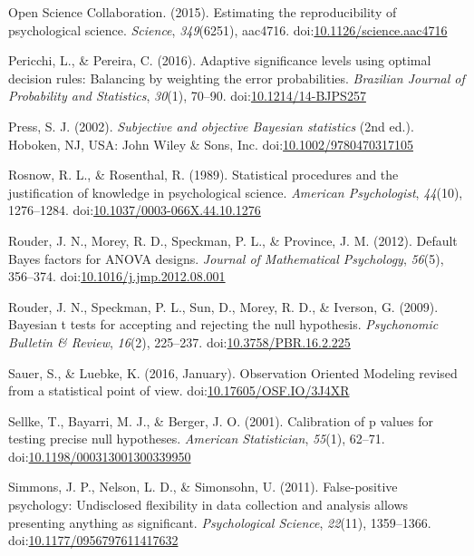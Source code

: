 \documentclass[,man, mask]{apa6}
\theoremstyle{definition}
\theoremstyle{definition}
\theoremstyle{definition}
\theoremstyle{remark}
\begin{document}
\hypertarget{ref-OpenScienceCollaboration2015}{}
Open Science Collaboration. (2015). Estimating the reproducibility of
psychological science. \emph{Science}, \emph{349}(6251), aac4716.
doi:\href{https://doi.org/10.1126/science.aac4716}{10.1126/science.aac4716}

\hypertarget{ref-Pericchi2016}{}
Pericchi, L., \& Pereira, C. (2016). Adaptive significance levels using
optimal decision rules: Balancing by weighting the error probabilities.
\emph{Brazilian Journal of Probability and Statistics}, \emph{30}(1),
70--90.
doi:\href{https://doi.org/10.1214/14-BJPS257}{10.1214/14-BJPS257}

\hypertarget{ref-Press2002}{}
Press, S. J. (2002). \emph{Subjective and objective Bayesian statistics}
(2nd ed.). Hoboken, NJ, USA: John Wiley \& Sons, Inc.
doi:\href{https://doi.org/10.1002/9780470317105}{10.1002/9780470317105}

\hypertarget{ref-Rosnow1989}{}
Rosnow, R. L., \& Rosenthal, R. (1989). Statistical procedures and the
justification of knowledge in psychological science. \emph{American
Psychologist}, \emph{44}(10), 1276--1284.
doi:\href{https://doi.org/10.1037/0003-066X.44.10.1276}{10.1037/0003-066X.44.10.1276}

\hypertarget{ref-Rouder2012}{}
Rouder, J. N., Morey, R. D., Speckman, P. L., \& Province, J. M. (2012).
Default Bayes factors for ANOVA designs. \emph{Journal of Mathematical
Psychology}, \emph{56}(5), 356--374.
doi:\href{https://doi.org/10.1016/j.jmp.2012.08.001}{10.1016/j.jmp.2012.08.001}

\hypertarget{ref-Rouder2009}{}
Rouder, J. N., Speckman, P. L., Sun, D., Morey, R. D., \& Iverson, G.
(2009). Bayesian t tests for accepting and rejecting the null
hypothesis. \emph{Psychonomic Bulletin \& Review}, \emph{16}(2),
225--237.
doi:\href{https://doi.org/10.3758/PBR.16.2.225}{10.3758/PBR.16.2.225}

\hypertarget{ref-Sauer2016}{}
Sauer, S., \& Luebke, K. (2016, January). Observation Oriented Modeling
revised from a statistical point of view.
doi:\href{https://doi.org/10.17605/OSF.IO/3J4XR}{10.17605/OSF.IO/3J4XR}

\hypertarget{ref-Sellke2001}{}
Sellke, T., Bayarri, M. J., \& Berger, J. O. (2001). Calibration of p
values for testing precise null hypotheses. \emph{American
Statistician}, \emph{55}(1), 62--71.
doi:\href{https://doi.org/10.1198/000313001300339950}{10.1198/000313001300339950}

\hypertarget{ref-Simmons2011}{}
Simmons, J. P., Nelson, L. D., \& Simonsohn, U. (2011). False-positive
psychology: Undisclosed flexibility in data collection and analysis
allows presenting anything as significant. \emph{Psychological Science},
\emph{22}(11), 1359--1366.
doi:\href{https://doi.org/10.1177/0956797611417632}{10.1177/0956797611417632}
\end{document}
